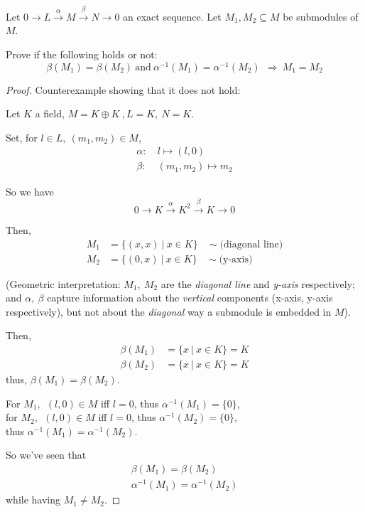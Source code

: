 \documentclass{article}
\theoremstyle{definition}
\newenvironment{ex}[1]
{\renewcommand\theinnerex{#1}\innerex}
{\endinnerex}
\begin{document}
\begin{ex}{R.3.5}
  Let $0 \longrightarrow L \stackrel{\alpha}{\longrightarrow} M \stackrel{\beta}{\longrightarrow} N \longrightarrow 0$ an exact sequence. Let $M_1, M_2 \subseteq M$ be submodules of $M$.

  Prove if the following holds or not:
  $$\beta(M_1)=\beta(M_2) ~\text{and}~ \alpha^{-1}(M_1)=\alpha^{-1}(M_2)~~\Longrightarrow~ M_1=M_2$$
\end{ex}
\begin{proof}
  Counterexample showing that it does not hold:

  Let $K$ a field, $M = K \oplus K~, L=K,~N=K$.

  Set, for $l \in L,~ (m_1, m_2) \in M$,
  \begin{align*}
    \alpha:~ &l \longmapsto (l, 0)\\
    \beta:~ &(m_1, m_2) \longmapsto m_2
  \end{align*}

  So we have
  $$0 \longrightarrow K \stackrel{\alpha}{\longrightarrow} K^2 \stackrel{\beta}{\longrightarrow} K \longrightarrow 0$$

  Then,
  \begin{align*}
    M_1 &= \{ (x, x) ~|~ x \in K\} ~~~~\sim\text{(diagonal line)} \\
    M_2 &= \{ (0, x) ~|~ x \in K\} ~~~~\sim\text{(y-axis)}
  \end{align*}

  (Geometric interpretation: $M_1,~ M_2$ are the \emph{diagonal line} and \emph{y-axis} respectively; and $\alpha,~\beta$ capture information about the \emph{vertical} components (x-axis, y-axis respectively), but not about the \emph{diagonal} way a submodule is embedded in $M$).

  Then,
  \begin{align*}
    \beta(M_1) &= \{ x ~|~ x \in K\} = K \\
    \beta(M_2) &= \{ x ~|~ x \in K\} = K
  \end{align*}
  thus, $\beta(M_1) = \beta(M_2)$.

  For $M_1,~~ (l,0)\in M$ iff $l=0$, thus $\alpha^{-1}(M_1) = \{0\}$,\\
  for $M_2,~~ (l,0)\in M$ iff $l=0$, thus $\alpha^{-1}(M_2) = \{0\}$,\\
  thus $\alpha^{-1}(M_1)=\alpha^{-1}(M_2)$.


  So we've seen that
  \begin{align*}
    \beta(M_1) = \beta(M_2)\\
    \alpha^{-1}(M_1)=\alpha^{-1}(M_2)
  \end{align*}
  while having $M_1 \neq M_2$.
\end{proof}
\end{document}
